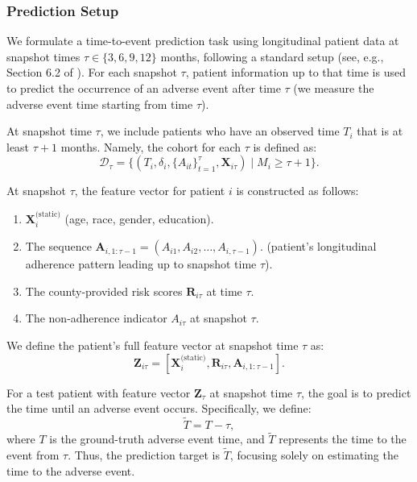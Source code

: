 \subsubsection{Prediction Setup}
\label{ch03:sec:methods_prediction}
We formulate a time-to-event prediction task using longitudinal patient data at snapshot times \(\tau \in \{3,6,9,12\}\) months, following a standard setup (see, e.g., Section 6.2 of \citet{chen2024introduction}). %
For each snapshot \(\tau\), patient information up to that time is used to predict the occurrence of an adverse event after time $\tau$ (we measure the adverse event time starting from time $\tau$). 

At snapshot time \(\tau\), we include patients who have an observed time $T_i$ that is at least \(\tau+1\) months. 
Namely, the cohort for each \(\tau\) is defined as:
\[
\mathcal{D}_\tau = \{(T_i, \delta_i, \{A_{it}\}_{t=1}^{\tau}, \mathbf{X}_{i\tau}) \mid M_i \geq \tau+1\}.
\]

At snapshot \(\tau\), the feature vector for patient \(i\) is constructed as follows:
\begin{enumerate}\renewcommand{\labelenumi}{(\roman{enumi})}\setlength{\itemsep}{0pt}
    \item {} \( \mathbf{X}_i^{\text{(static)}} \) (age, race, gender, education).
    \item {} The sequence \(\mathbf{A}_{i,1:\tau-1} = (A_{i1}, A_{i2}, \dots, A_{i,\tau-1})\). (patient's longitudinal adherence pattern leading up to snapshot time \(\tau\)).
    \item {} The county-provided risk scores \(\mathbf{R}_{i\tau}\) at time \(\tau\).
    \item {} The non-adherence indicator \(A_{i\tau}\) at snapshot \(\tau\).
\end{enumerate}

We define the patient’s full feature vector at snapshot time \( \tau \) as:
\[
\mathbf{Z}_{i\tau} = \left[ \mathbf{X}^{\text{(static)}}_{i}, \mathbf{R}_{i\tau}, \mathbf{A}_{i,1:\tau-1} \right].
\]

For a test patient with feature vector \(\mathbf{Z}_{\tau}\) at snapshot time \(\tau\), the goal is to predict the time until an adverse event occurs.  
Specifically, we define: 
\[\widetilde{T} = T - \tau,\]
where \(T\) is the ground-truth adverse event time, and 
\(\widetilde{T}\) represents the time to the event from \(\tau\).  
Thus, the prediction target is \(\widetilde{T}\), focusing solely on estimating the time to the adverse event.

